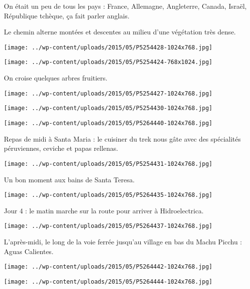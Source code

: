 On était un peu de tous les pays : France, Allemagne, Angleterre, Canada, Israël, République tchèque, ça fait parler anglais.

Le chemin alterne montées et descentes au milieu d'une végétation très dense. 
\begin{center} \texttt{[image: ../wp-content/uploads/2015/05/P5254428-1024x768.jpg]} \end{center}

\begin{center} \texttt{[image: ../wp-content/uploads/2015/05/P5254424-768x1024.jpg]} \end{center}

On croise quelques arbres fruitiers. 
\begin{center} \texttt{[image: ../wp-content/uploads/2015/05/P5254427-1024x768.jpg]} \end{center}

\begin{center} \texttt{[image: ../wp-content/uploads/2015/05/P5254430-1024x768.jpg]} \end{center}
\begin{center} \texttt{[image: ../wp-content/uploads/2015/05/P5264440-1024x768.jpg]} \end{center}
\pagebreak

Repas de midi à Santa Maria : le cuisiner du trek nous gâte avec des spécialités péruviennes, ceviche et papas rellenas. 
\begin{center} \texttt{[image: ../wp-content/uploads/2015/05/P5254431-1024x768.jpg]} \end{center}

Un bon moment aux bains de Santa Teresa. 
\begin{center} \texttt{[image: ../wp-content/uploads/2015/05/P5264435-1024x768.jpg]} \end{center}
\pagebreak

Jour 4 : le matin marche sur la route pour arriver à Hidroelectrica. 
\begin{center} \texttt{[image: ../wp-content/uploads/2015/05/P5264437-1024x768.jpg]} \end{center}

L'après-midi, le long de la voie ferrée jusqu'au village en bas du Machu Picchu : Aguas Calientes. 
\begin{center} \texttt{[image: ../wp-content/uploads/2015/05/P5264442-1024x768.jpg]} \end{center}
\begin{center} \texttt{[image: ../wp-content/uploads/2015/05/P5264444-1024x768.jpg]} \end{center}

